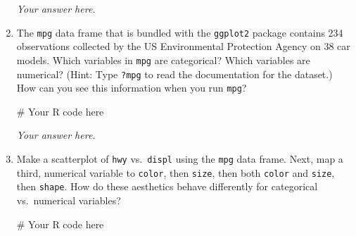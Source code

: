 \documentclass[
  letterpaper,
  DIV=11,
  numbers=noendperiod]{scrreprt}
\newenvironment{Shaded}{\begin{snugshade}}{\end{snugshade}}
\newcommand{\CommentTok}[1]{\textcolor[rgb]{0.37,0.37,0.37}{#1}}
\begin{document}
\begin{enumerate}
\begin{tcolorbox}
  \emph{Your answer here.}

  \end{tcolorbox}
\item
  The \texttt{mpg} data frame that is bundled with the \texttt{ggplot2}
  package contains 234 observations collected by the US Environmental
  Protection Agency on 38 car models. Which variables in \texttt{mpg}
  are categorical? Which variables are numerical? (Hint: Type
  \texttt{?mpg} to read the documentation for the dataset.) How can you
  see this information when you run \texttt{mpg}?

  \begin{tcolorbox}[enhanced jigsaw, breakable, bottomtitle=1mm, left=2mm, colback=white, toprule=.15mm, leftrule=.75mm, colframe=quarto-callout-note-color-frame, colbacktitle=quarto-callout-note-color!10!white, title={Answer}, coltitle=black, toptitle=1mm, bottomrule=.15mm, opacitybacktitle=0.6, arc=.35mm, rightrule=.15mm, titlerule=0mm, opacityback=0]

\begin{Shaded}
\begin{Highlighting}[]
\CommentTok{\# Your R code here}
\end{Highlighting}
\end{Shaded}

  \emph{Your answer here.}

  \end{tcolorbox}
\item
  Make a scatterplot of \texttt{hwy} vs.~\texttt{displ} using the
  \texttt{mpg} data frame. Next, map a third, numerical variable to
  \texttt{color}, then \texttt{size}, then both \texttt{color} and
  \texttt{size}, then \texttt{shape}. How do these aesthetics behave
  differently for categorical vs.~numerical variables?

  \begin{tcolorbox}[enhanced jigsaw, breakable, bottomtitle=1mm, left=2mm, colback=white, toprule=.15mm, leftrule=.75mm, colframe=quarto-callout-note-color-frame, colbacktitle=quarto-callout-note-color!10!white, title={Answer}, coltitle=black, toptitle=1mm, bottomrule=.15mm, opacitybacktitle=0.6, arc=.35mm, rightrule=.15mm, titlerule=0mm, opacityback=0]

\begin{Shaded}
\begin{Highlighting}[]
\CommentTok{\# Your R code here}
\end{Highlighting}
\end{Shaded}


\end{tcolorbox}
\end{enumerate}
\end{document}
